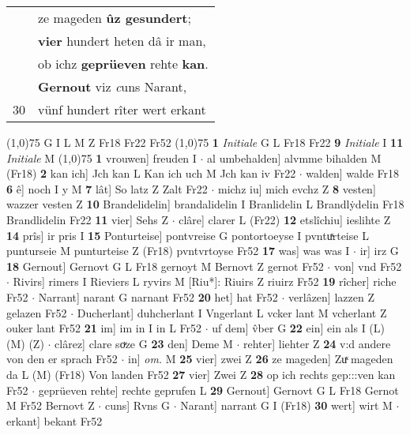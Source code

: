 \documentclass[8pt,a4paper,notitlepage]{article}
\begin{document}
\begin{table}[ht]
\begin{minipage}[t]{0.5\linewidth}
\begin{tabular}{rl}
 & ze mageden \textbf{ûz gesundert};\\ 
 & \textbf{vier} hundert heten dâ ir man,\\ 
 & ob ichz \textbf{geprüeven} rehte \textbf{kan}.\\ 
 & \textbf{Gernout} viz \textit{c}uns Narant,\\ 
30 & vünf hundert rîter wert erkant\\ 
\end{tabular}
\scriptsize
\line(1,0){75} \newline
G I L M Z Fr18 Fr22 Fr52 \newline
\line(1,0){75} \newline
\textbf{1} \textit{Initiale} G L Fr18 Fr22  \textbf{9} \textit{Initiale} I  \textbf{11} \textit{Initiale} M  \newline
\line(1,0){75} \newline
\textbf{1} vrouwen] freuden I  $\cdot$ al umbehalden] alvmme bihalden M (Fr18) \textbf{2} kan ich] Jch kan L Kan ich uch M Jch kan iv Fr22  $\cdot$ walden] walde Fr18 \textbf{6} ê] noch I y M \textbf{7} lât] So latz Z Zalt Fr22  $\cdot$ michz iu] mich evchz Z \textbf{8} vesten] wazzer vesten Z \textbf{10} Brandelidelin] brandalidelin I Branlidelin L Brandlẏdelin Fr18 Brandlidelin Fr22 \textbf{11} vier] Sehs Z  $\cdot$ clâre] clarer L (Fr22) \textbf{12} etslîchiu] ieslihte Z \textbf{14} prîs] ir pris I \textbf{15} Ponturteise] pontvreise G pontortoeyse I pvntuͯrteise L punturseie M punturteise Z (Fr18) pvntvrtoyse Fr52 \textbf{17} was] was was I  $\cdot$ ir] irz G \textbf{18} Gernout] Gernovt G L Fr18 gernoyt M Bernovt Z gernot Fr52  $\cdot$ von] vnd Fr52  $\cdot$ Rivirs] rimers I Rieviers L ryvirs M [Riu*]: Riuirs Z riuirz Fr52 \textbf{19} rîcher] riche Fr52  $\cdot$ Narrant] narant G narnant Fr52 \textbf{20} het] hat Fr52  $\cdot$ verlâzen] lazzen Z gelazen Fr52  $\cdot$ Ducherlant] duhcherlant I Vngerlant L vcker lant M vcherlant Z ouker lant Fr52 \textbf{21} im] im in I in L Fr52  $\cdot$ uf dem] v̂ber G \textbf{22} ein] ein als I (L) (M) (Z)  $\cdot$ clârez] clare soͮze G \textbf{23} den] Deme M  $\cdot$ rehter] liehter Z \textbf{24} v:d andere von den er sprach Fr52  $\cdot$ in] \textit{om.} M \textbf{25} vier] zwei Z \textbf{26} ze mageden] Zuͯ mageden da L (M) (Fr18) Von landen Fr52 \textbf{27} vier] Zwei Z \textbf{28} op ich rechts gep:::ven kan Fr52  $\cdot$ geprüeven rehte] rechte geprufen L \textbf{29} Gernout] Gernovt G L Fr18 Gernot M Fr52 Bernovt Z  $\cdot$ cuns] Rvns G  $\cdot$ Narant] narrant G I (Fr18) \textbf{30} wert] wirt M  $\cdot$ erkant] bekant Fr52 \newline

\end{minipage}
\end{table}
\end{document}
